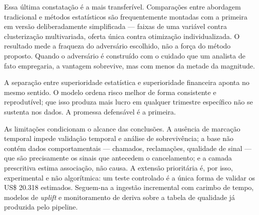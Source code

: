 \documentclass[10pt,a4paper]{article}
\begin{document}
Essa última constatação é a mais transferível. Comparações entre abordagem tradicional e
métodos estatísticos são frequentemente montadas com a primeira em versão deliberadamente
simplificada --- faixas de uma variável contra clusterização multivariada, oferta única
contra otimização individualizada. O resultado mede a fraqueza do adversário escolhido,
não a força do método proposto. Quando o adversário é construído com o cuidado que um
analista de fato empregaria, a vantagem sobrevive, mas com menos da metade da magnitude.

A separação entre superioridade estatística e superioridade financeira aponta no mesmo
sentido. O modelo ordena risco melhor de forma consistente e reprodutível; que isso
produza mais lucro em qualquer trimestre específico não se sustenta nos dados. A promessa
defensável é a primeira.

As limitações condicionam o alcance das conclusões. A ausência de marcação temporal impede
validação temporal e análise de sobrevivência; a base não contém dados comportamentais ---
chamados, reclamações, qualidade de sinal --- que são precisamente os sinais que antecedem o
cancelamento; e a camada prescritiva estima associação, não causa. A extensão prioritária é, por
isso, experimental e não algorítmica: um teste controlado é a única forma de validar os
US\$ 20.318 estimados. Seguem-na a ingestão incremental com carimbo de tempo, modelos de
\emph{uplift} e monitoramento de deriva sobre a tabela de qualidade já produzida pelo pipeline.
\end{document}
